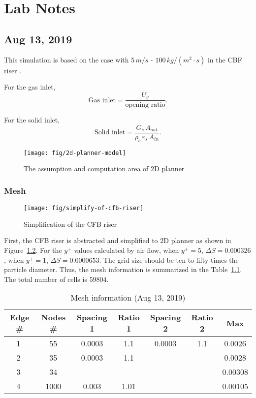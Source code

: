 \chapter{Lab Notes}
\section{Aug 13, 2019}
This simulation is based on the case with $5\,\si{m/s}$ - $100\,\si{kg/(m^2 \cdot s)}$ in the CBF riser \citep{li2010}. 

For the gas inlet, 
\begin{equation}
  \text{Gas inlet} = \frac{U_g}{\text{opening ratio}}.
\end{equation}

For the solid inlet, 
\begin{equation}
  \text{Solid inlet} = 
  \frac{G_s\,A_{out}}{\rho_b\, \varepsilon_s \, A_{in}}.
\end{equation}


\begin{figure}[!ht]
    \raggedleft
    \texttt{[image: fig/2d-planner-model]}
    \caption{The assumption and computation area of 2D planner}
    \label{fig: assumption of 2D planner}
\end{figure}

\subsection{Mesh}
\begin{figure}[!ht]
    \raggedleft
    \texttt{[image: fig/simplify-of-cfb-riser]}
    \caption{Simplification of the CFB riser}
    \label{fig: simplification of the CFB riser}
\end{figure}

First, the CFB riser is abstracted and simplified to 2D planner as shown in Figure~\ref{fig: simplification of the CFB riser}. 
For the $y^+$ values calculated by air flow, when $y^+ = 5$, $\Delta S = \num{0.000326}$, when $y^+ = 1$, $\Delta S = \num{0.0000653}$. 
The grid size should be ten to fifty times the particle diameter. 
Thus, the mesh information is summarized in the Table~\ref{tab: mesh aug 13 2019}. 
The total number of cells is $\num{59804}$. 
\begin{table}[!ht]
    \raggedleft
    \caption{Mesh information (Aug 13, 2019)}
    \begin{tabular}{ccccccc}
      \toprule
      Edge \# & Nodes \# & Spacing 1 & Ratio 1 & Spacing 2 & Ratio 2 & Max \\
      \midrule
      \textcircled{1} & 55    & 0.0003 & 1.1   & 0.0003 & 1.1   & 0.0026 \\
      \textcircled{2} & 35    & 0.0003 & 1.1   &       &       & 0.0028 \\
      \textcircled{3} & 34    &       &       &       &       & 0.00308 \\
      \textcircled{4} & 1000  & 0.003 & 1.01  &       &       & 0.00105 \\
      \bottomrule
    \end{tabular}%
    \label{tab: mesh aug 13 2019}%
\end{table}%

